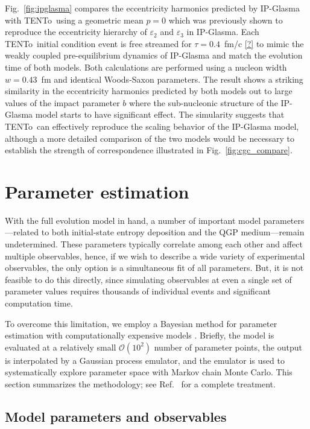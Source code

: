 \documentclass[aps,prc,reprint,amsmath,nofootinbib,superscriptaddress]{revtex4-1}
\newcommand{\trento}{T\raisebox{-0.5ex}{R}ENTo}
\newcommand{\order}[1]{$\mathcal O(10^{#1})$}
\begin{document}
Fig.~\ref{fig:ipglasma} compares the eccentricity harmonics predicted by IP-Glasma with \trento\ using a geometric mean ${p=0}$ which was previously shown to reproduce the eccentricity hierarchy of $\varepsilon_2$ and $\varepsilon_3$ in IP-Glasma. Each \trento\ initial condition event is free streamed for $\tau=0.4$~fm/c \ref{?} to mimic the weakly coupled pre-equilibrium dynamics of IP-Glasma and match the evolution time of both models. Both calculations are performed using a nucleon width $w=0.43$~fm and identical Woods-Saxon parameters. The result shows a striking similarity in the eccentricity harmonics predicted by both models out to large values of the impact parameter $b$ where the sub-nucleonic structure of the IP-Glasma model starts to have significant effect. The simularity suggests that \trento\ can effectively reproduce the scaling behavior of the IP-Glasma model, although a more detailed comparison of the two models would be necessary to establish the strength of correspondence illustrated in Fig.~\ref{fig:cgc_compare}.


\section{Parameter estimation}

With the full evolution model in hand, a number of important model parameters---related to both initial-state entropy deposition and the QGP medium---remain undetermined.
These parameters typically correlate among each other and affect multiple observables, hence, if we wish to describe a wide variety of experimental observables, the only option is a simultaneous fit of all parameters.
But, it is not feasible to do this directly, since simulating observables at even a single set of parameter values requires thousands of individual events and significant computation time.

To overcome this limitation, we employ a Bayesian method for parameter estimation with computationally expensive models \cite{OHagan:2006ba,Higdon:2008cmc,Higdon:2014tva,Wesolowski:2015fqa}.
Briefly, the model is evaluated at a relatively small \order 2 number of parameter points, the output is interpolated by a Gaussian process emulator, and the emulator is used to systematically explore parameter space with Markov chain Monte Carlo.
This section summarizes the methodology; see Ref.~\cite{Bernhard:2015hxa} for a complete treatment.

\subsection{Model parameters and observables}
\end{document}
